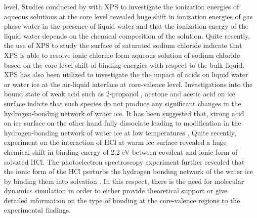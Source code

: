 \documentclass[a4paper,11pt]{report}
\begin{document}
level. Studies conducted by \citep{olivieri2016quantitative} with XPS to investigate the ionization energies of aqueous solutions at the core level revealed huge
shift in ionization energies of gas phase water in the presence of liquid water and that the ionization energy of the liquid water depends 
on the chemical composition of the solution. Quite recently, the use of XPS to study the surface of saturated
sodium chloride \citep{tissot2015cation,gaiduk2016photoelectron} indicate that XPS is able to resolve ionic chlorine form aqueous solution of sodium chloride based on the core level 
shift of binding energies with respect to the bulk liquid.
XPS has also been utilized to investigate the the impact of acids on liquid water or water ice at the air-liquid interface at core-valence level. 
Investigations into the bound state of weak acid such as 2-propanol \citep{newberg2015adsorption}, acetone \citep{starr2011acetone} and acetic
acid \citep{krepelova2013adsorption} on ice surface indicte that such species do not produce any significant changes in the hydrogen-bonding
network of water ice. It has been suggested that, strong acid on ice surface on the other hand fully dissociate leading to modification
in the hydrogen-bonding network of water ice at low temperatures \citep{parent2011hcl}. Quite recently, experiment on the 
interaction of HCl at warm ice surface revealed a huge chemical shift in binding energy of 2.2 eV between covalent and ionic form of 
solvated HCl. The photoelectron spectroscopy experiment further revealed that the ionic form of the HCl perturbs the 
hydrogen bonding network of the water ice by binding them into solvation \citep{kong2017coexistence}. In this respect, there is the need for
molecular dynamics simulation in order to either provide theoretical support or give detailed information on the type of bonding at the 
core-valence regions to the experimental findings. 
\end{document}
